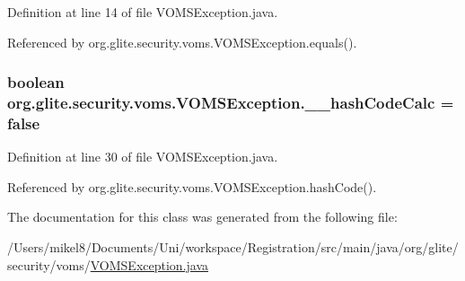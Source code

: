 Definition at line 14 of file VOMSException.java.



Referenced by org.glite.security.voms.VOMSException.equals().

\hypertarget{classorg_1_1glite_1_1security_1_1voms_1_1VOMSException_a7e4179821de4dcaab56ecd6d4ee0babb}{
\subsubsection[{\_\-\_\-hashCodeCalc}]{\setlength{\rightskip}{0pt plus 5cm}boolean {\bf org.glite.security.voms.VOMSException.\_\-\_\-hashCodeCalc} = false}}
\label{classorg_1_1glite_1_1security_1_1voms_1_1VOMSException_a7e4179821de4dcaab56ecd6d4ee0babb}


Definition at line 30 of file VOMSException.java.



Referenced by org.glite.security.voms.VOMSException.hashCode().



The documentation for this class was generated from the following file:\begin{DoxyCompactItemize}
\item 
/Users/mikel8/Documents/Uni/workspace/Registration/src/main/java/org/glite/security/voms/\hyperlink{VOMSException_8java}{VOMSException.java}\end{DoxyCompactItemize}
